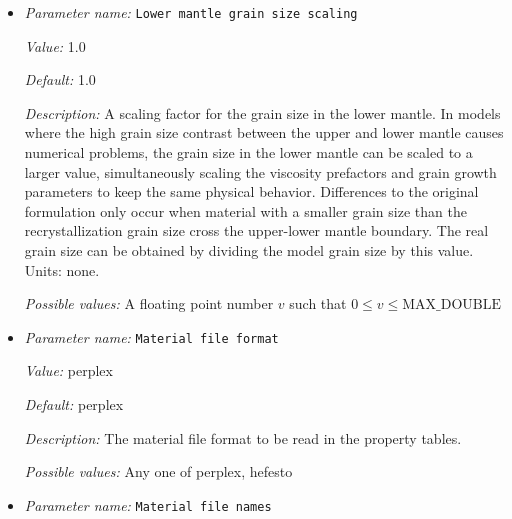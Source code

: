 \begin{itemize}
{\it Description:} The prefactor for the Ostwald ripening grain growth law $G_0$. This is dependent on water content, which is assumed to be 50 H/$10^6$ Si for the default value. Units: $m^{p_g}/s$.


{\it Possible values:} A list of 0 to 4294967295 elements where each element is [A floating point number $v$ such that $0 \leq v \leq \text{MAX\_DOUBLE}$]
\item {\it Parameter name:} {\tt Lower mantle grain size scaling}
\label{parameters:Material model/Grain size model/Lower mantle grain size scaling}
\label{parameters:Material_20model/Grain_20size_20model/Lower_20mantle_20grain_20size_20scaling}


{\it Value:} 1.0


{\it Default:} 1.0


{\it Description:} A scaling factor for the grain size in the lower mantle. In models where the high grain size contrast between the upper and lower mantle causes numerical problems, the grain size in the lower mantle can be scaled to a larger value, simultaneously scaling the viscosity prefactors and grain growth parameters to keep the same physical behavior. Differences to the original formulation only occur when material with a smaller grain size than the recrystallization grain size cross the upper-lower mantle boundary. The real grain size can be obtained by dividing the model grain size by this value. Units: none.


{\it Possible values:} A floating point number $v$ such that $0 \leq v \leq \text{MAX\_DOUBLE}$
\item {\it Parameter name:} {\tt Material file format}
\label{parameters:Material model/Grain size model/Material file format}
\label{parameters:Material_20model/Grain_20size_20model/Material_20file_20format}


{\it Value:} perplex


{\it Default:} perplex


{\it Description:} The material file format to be read in the property tables.


{\it Possible values:} Any one of perplex, hefesto
\item {\it Parameter name:} {\tt Material file names}
\label{parameters:Material model/Grain size model/Material file names}
\label{parameters:Material_20model/Grain_20size_20model/Material_20file_20names}



\end{itemize}
